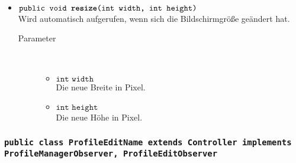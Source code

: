 \begin{description}
\begin{itemize}
		\item $\texttt{public void \textbf{resize}(int width, int height)}$ \\ Wird automatisch aufgerufen, wenn sich die Bildschirmgröße geändert hat.
		\begin{description}
			\item[Parameter] \hfill \\
			\vspace{-.8cm}
			\begin{itemize}
				\item $\texttt{int width}$ \\ Die neue Breite in Pixel.
				\item $\texttt{int height}$ \\ Die neue Höhe in Pixel.
			\end{itemize}
		\end{description}
	\end{itemize}
\end{description}

\subsubsection{\normalfont \texttt{public class \textbf{ProfileEditName} extends Controller implements ProfileManagerObserver, ProfileEditObserver}}

